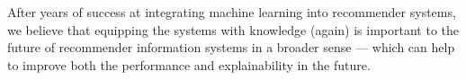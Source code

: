 \documentclass[algorithms,article,accept,moreauthors,pdftex,10pt,a4paper]{Definitions/mdpi}
\begin{document}
After years of success at integrating machine learning into recommender systems, we believe that equipping the systems with knowledge (again) is important to the future of recommender information systems in a broader sense --- which can help to improve both the performance and explainability in the future.






\iffalse

\reftitle{References}
\begin{thebibliography}{999}
\bibitem[Author1(year)]{ref-journal}
Author1, T. The title of the cited article. {\em Journal Abbreviation} {\bf 2008}, {\em 10}, 142-149, DOI.
\bibitem[Author2(year)]{ref-book}
Author2, L. The title of the cited contribution. In {\em The Book Title}; Editor1, F., Editor2, A., Eds.; Publishing House: City, Country, 2007; pp. 32-58, ISBN.
\end{thebibliography}
\fi 
\end{document}
